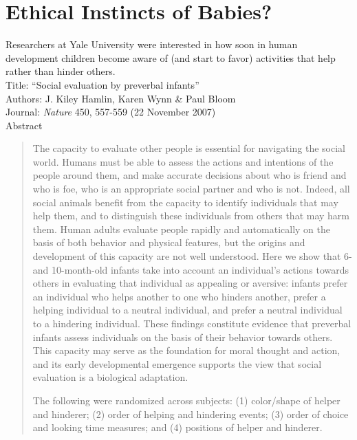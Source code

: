 \def\theTopic{Reading 3}


\section{ Ethical Instincts of Babies?}


Researchers at Yale University were interested in how soon in human
development children become aware of (and start to favor) activities
that help rather than hinder others.\\
Title: ``Social evaluation by preverbal infants''
\\
Authors: J. Kiley Hamlin, Karen Wynn \& Paul Bloom
\\
Journal: {\it Nature} 450, 557-559 (22 November 2007) 
\\
Abstract \vspace{-.5cm}
\begin{quotation}
  The capacity to evaluate other people is essential for navigating the
social world. Humans must be able to assess the actions and intentions
of the people around them, and make accurate decisions about who is
friend and who is foe, who is an appropriate social partner and who is
not. Indeed, all social animals benefit from the capacity to identify
individuals  that may help them, and to distinguish these
individuals from others that may harm them. Human adults evaluate
people rapidly and automatically on the basis of both behavior and
physical features, but the origins and
development of this capacity are not well understood. Here we show
that 6- and 10-month-old infants take into account an individual's
actions towards others in evaluating that individual as appealing or
aversive: infants prefer an individual who helps another to one who
hinders another, prefer a helping individual to a neutral individual,
and prefer a neutral individual to a hindering individual. These
findings constitute evidence that preverbal infants assess individuals
on the basis of their behavior towards others. This capacity may
serve as the foundation for moral thought and action, and its early
developmental emergence supports the view that social evaluation is a
biological adaptation. 



The following were randomized across subjects:
(1) color/shape of helper and hinderer; (2) order of helping and
hindering events; (3) order of choice and looking time
measures; and (4) positions of helper and hinderer. 
\end{quotation}

